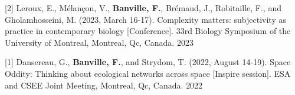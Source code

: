 

\begin{cventries}

  \cventry
    {[2] Leroux, E., Mélançon, V., \textbf{Banville, F.}, Brémaud, J., Robitaille, F., and Gholamhosseini, M. (2023, March 16-17). Complexity matters: subjectivity as practice in contemporary biology [Conference]. 33rd Biology Symposium of the University of Montreal, Montreal, Qc, Canada.} 
    {} {} {2023} 
    {
      \begin{cvitems} %
      \end{cvitems}
    }

  \cventry
    {[1] Dansereau, G., \textbf{Banville, F.}, and Strydom, T. (2022, August 14-19). Space Oddity: Thinking about ecological networks across space [Inspire session]. ESA and CSEE Joint Meeting, Montreal, Qc, Canada.} 
    {} {} {2022} 
    {
      \begin{cvitems} %
      \end{cvitems}
    }

\end{cventries}
 

